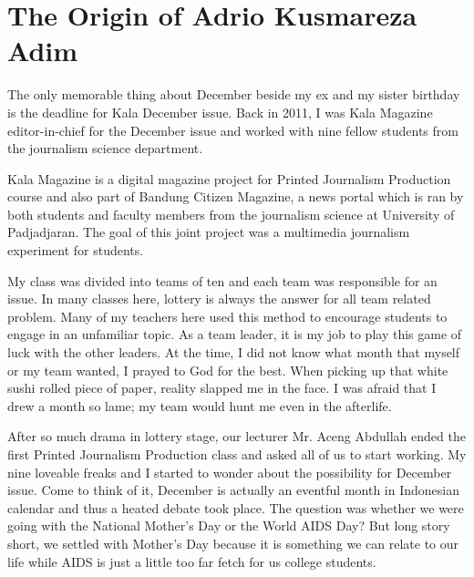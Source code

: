 \documentclass{article}
\begin{document}
\part{The Origin of Adrio Kusmareza Adim}

The only memorable thing about December beside my ex and my sister birthday is the deadline for Kala December issue. Back in 2011, I was Kala Magazine editor-in-chief for the December issue and worked with nine fellow students from the journalism science department. 

Kala Magazine is a digital magazine project for Printed Journalism Production course and also part of Bandung Citizen Magazine, a news portal which is ran by both students and faculty members from the journalism science at University of Padjadjaran. The goal of this joint project was a multimedia journalism experiment for students.

My class was divided into teams of ten and each team was responsible for an issue. In many classes here, lottery is always the answer for all team related problem. Many of my teachers here used this method to encourage students to engage in an unfamiliar topic. As a team leader, it is my job to play this game of luck with the other leaders. At the time, I did not know what month that myself or my team wanted, I prayed to God for the best. When picking up that white sushi rolled piece of paper, reality slapped me in the face. I was afraid that I drew a month so lame; my team would hunt me even in the afterlife.

After so much drama in lottery stage, our lecturer Mr. Aceng Abdullah ended the first Printed Journalism Production class and asked all of us to start working. My nine loveable freaks and I started to wonder about the possibility for December issue. Come to think of it, December is actually an eventful month in Indonesian calendar and thus a heated debate took place. The question was whether we were going with the National Mother’s Day or the World AIDS Day? But long story short, we settled with Mother’s Day because it is something we can relate to our life while AIDS is just a little too far fetch for us college students.
\end{document}
